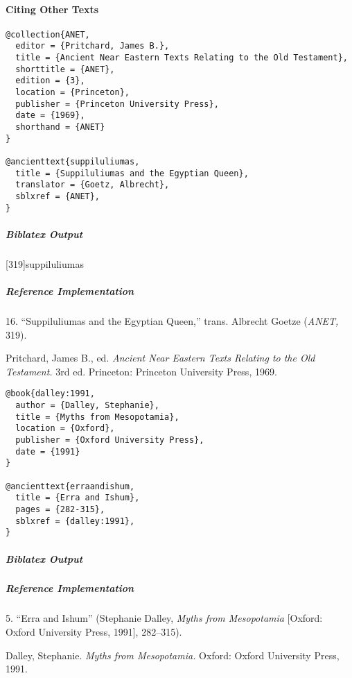 \documentclass[a4paper]{article}
\newenvironment{biboutput}{%
  \subparagraph{Biblatex Output}
}{\color{black}}
\newenvironment{refimp}{%
  \subparagraph{Reference Implementation}
  \color{reference-colour}
  \rm
}{\par\color{black}}
\begin{document}
\paragraph{Citing Other Texts}

\begin{lstlisting}
@collection{ANET,
  editor = {Pritchard, James B.},
  title = {Ancient Near Eastern Texts Relating to the Old Testament},
  shorttitle = {ANET},
  edition = {3},
  location = {Princeton},
  publisher = {Princeton University Press},
  date = {1969},
  shorthand = {ANET}
}

@ancienttext{suppiluliumas,
  title = {Suppiluliumas and the Egyptian Queen},
  translator = {Goetz, Albrecht},
  sblxref = {ANET},
}
\end{lstlisting}

\begin{biboutput}
  [319]{suppiluliumas}
\end{biboutput}

\begin{refimp}
  16. “Suppiluliumas and the Egyptian Queen,” trans. Albrecht Goetze
  (\emph{ANET,} 319).

  \hangindent\bibindent Pritchard, James B., ed. \emph{Ancient Near Eastern
  Texts Relating to the Old Testament.} 3rd ed. Princeton: Princeton
  University Press, 1969.

\end{refimp}

\medskip

\begin{lstlisting}
@book{dalley:1991,
  author = {Dalley, Stephanie},
  title = {Myths from Mesopotamia},
  location = {Oxford},
  publisher = {Oxford University Press},
  date = {1991}
}

@ancienttext{erraandishum,
  title = {Erra and Ishum},
  pages = {282-315},
  sblxref = {dalley:1991},
}
\end{lstlisting}

\begin{biboutput}
\end{biboutput}

\begin{refimp}
  5. “Erra and Ishum” (Stephanie Dalley, \emph{Myths from Mesopotamia}
  [Oxford: Oxford University Press, 1991], 282–315).
  
  \hangindent\bibindent Dalley, Stephanie. \emph{Myths from Mesopotamia.}
  Oxford: Oxford University Press, 1991.
\end{refimp}
\end{document}
